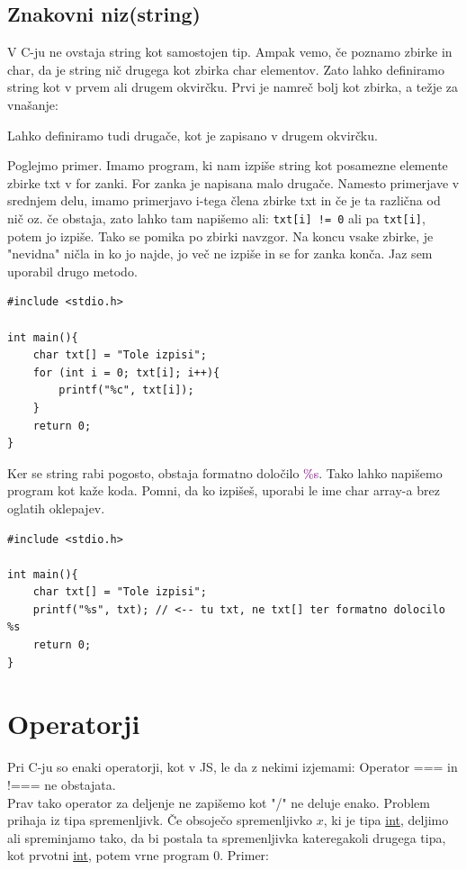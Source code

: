 \documentclass[a4paper, 12pt]{article}
\begin{document}
\subsection{Znakovni niz(string)}
V C-ju ne ovstaja string kot samostojen tip. Ampak vemo, če poznamo zbirke in char, da je string nič drugega kot zbirka char elementov. Zato lahko definiramo string kot v prvem ali drugem okvirčku. Prvi je namreč bolj kot zbirka, a težje za vnašanje:\

{\centering{}}
{\centering{}\par}
Lahko definiramo tudi drugače, kot je zapisano v drugem okvirčku.\

Poglejmo primer. Imamo program, ki nam izpiše string kot posamezne elemente zbirke txt v for zanki. For zanka je napisana malo drugače. Namesto primerjave v srednjem delu, imamo primerjavo i-tega člena zbirke txt in če je ta različna od nič oz. če obstaja, zato lahko tam napišemo ali: \texttt{txt[i] != 0} ali pa \texttt{txt[i]}, potem jo izpiše. Tako se pomika po zbirki navzgor. Na koncu vsake zbirke, je "nevidna" ničla in ko jo najde, jo več ne izpiše in se for zanka konča. Jaz sem uporabil drugo metodo.

\begin{lstlisting}
#include <stdio.h>

int main(){
	char txt[] = "Tole izpisi";
	for (int i = 0; txt[i]; i++){
		printf("%c", txt[i]);
	}
	return 0;
}
\end{lstlisting}

Ker se string rabi pogosto, obstaja formatno določilo \textcolor{purple}{\%s}. Tako lahko napišemo program kot kaže koda. Pomni, da ko izpišeš, uporabi le ime char array-a brez oglatih oklepajev.

\begin{lstlisting}
#include <stdio.h>

int main(){
	char txt[] = "Tole izpisi";
	printf("%s", txt); // <-- tu txt, ne txt[] ter formatno dolocilo %s
	return 0;
}
\end{lstlisting}

\section{Operatorji}

Pri C-ju so enaki operatorji, kot v JS, le da z nekimi izjemami: Operator === in !=== ne obstajata.\\
Prav tako operator za deljenje ne zapišemo kot "/" ne deluje enako. Problem prihaja iz tipa spremenljivk. Če obsoječo spremenljivko $x$, ki je tipa \underline{int}, deljimo ali spreminjamo tako, da bi postala ta spremenljivka kateregakoli drugega tipa, kot prvotni \underline{int}, potem vrne program 0. Primer:
\end{document}
